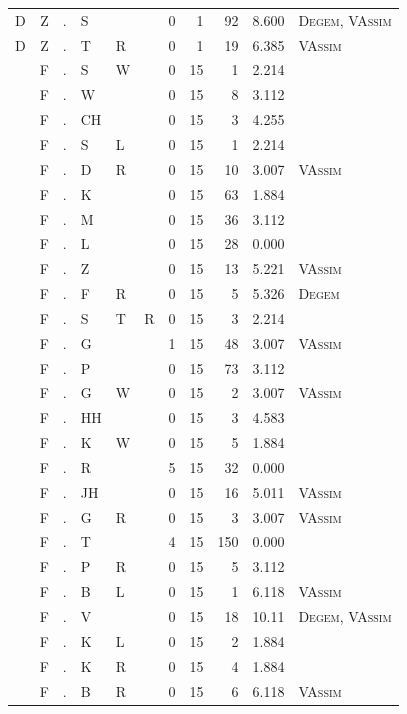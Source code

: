 \documentclass[12pt]{article}
\begin{document}
\begin{longtable}{r@{ } r@{ } c@{ } l@{ } l@{ } l@{ } r r r r l }
D & Z & . & S &  &  & 0 & 1 & 92 & 8.600 & \textsc{Degem}, \textsc{VAssim} \\
D & Z & . & T & R &  & 0 & 1 & 19 & 6.385 & \textsc{VAssim} \\
 & F & . & S & W &  & 0 & 15 & 1 & 2.214 &  \\
 & F & . & W &  &  & 0 & 15 & 8 & 3.112 &  \\
 & F & . & CH &  &  & 0 & 15 & 3 & 4.255 &  \\
 & F & . & S & L &  & 0 & 15 & 1 & 2.214 &  \\
 & F & . & D & R &  & 0 & 15 & 10 & 3.007 & \textsc{VAssim} \\
 & F & . & K &  &  & 0 & 15 & 63 & 1.884 &  \\
 & F & . & M &  &  & 0 & 15 & 36 & 3.112 &  \\
 & F & . & L &  &  & 0 & 15 & 28 & 0.000 &  \\
 & F & . & Z &  &  & 0 & 15 & 13 & 5.221 & \textsc{VAssim} \\
 & F & . & F & R &  & 0 & 15 & 5 & 5.326 & \textsc{Degem} \\
 & F & . & S & T & R & 0 & 15 & 3 & 2.214 &  \\
 & F & . & G &  &  & 1 & 15 & 48 & 3.007 & \textsc{VAssim} \\
 & F & . & P &  &  & 0 & 15 & 73 & 3.112 &  \\
 & F & . & G & W &  & 0 & 15 & 2 & 3.007 & \textsc{VAssim} \\
 & F & . & HH &  &  & 0 & 15 & 3 & 4.583 &  \\
 & F & . & K & W &  & 0 & 15 & 5 & 1.884 &  \\
 & F & . & R &  &  & 5 & 15 & 32 & 0.000 &  \\
 & F & . & JH &  &  & 0 & 15 & 16 & 5.011 & \textsc{VAssim} \\
 & F & . & G & R &  & 0 & 15 & 3 & 3.007 & \textsc{VAssim} \\
 & F & . & T &  &  & 4 & 15 & 150 & 0.000 &  \\
 & F & . & P & R &  & 0 & 15 & 5 & 3.112 &  \\
 & F & . & B & L &  & 0 & 15 & 1 & 6.118 & \textsc{VAssim} \\
 & F & . & V &  &  & 0 & 15 & 18 & 10.11 & \textsc{Degem}, \textsc{VAssim} \\
 & F & . & K & L &  & 0 & 15 & 2 & 1.884 &  \\
 & F & . & K & R &  & 0 & 15 & 4 & 1.884 &  \\
 & F & . & B & R &  & 0 & 15 & 6 & 6.118 & \textsc{VAssim} \\

\end{longtable}
\end{document}
